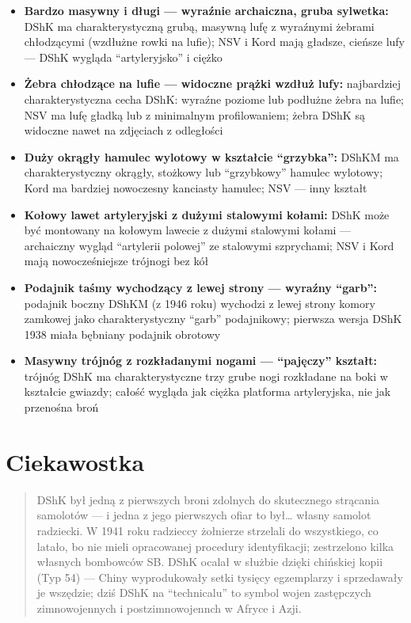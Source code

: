 \documentclass[12pt,openany,oneside]{book}
\providecommand{\tightlist}{%
  \setlength{\itemsep}{0pt}\setlength{\parskip}{0pt}}
\begin{document}
\begin{itemize}
\tightlist
\item
  \textbf{Bardzo masywny i długi --- wyraźnie archaiczna, gruba
  sylwetka:} DShK ma charakterystyczną grubą, masywną lufę z wyraźnymi
  żebrami chłodzącymi (wzdłużne rowki na lufie); NSV i Kord mają
  gładsze, cieńsze lufy --- DShK wygląda ``artyleryjsko'' i ciężko
\item
  \textbf{Żebra chłodzące na lufie --- widoczne prążki wzdłuż lufy:}
  najbardziej charakterystyczna cecha DShK: wyraźne poziome lub podłużne
  żebra na lufie; NSV ma lufę gładką lub z minimalnym profilowaniem;
  żebra DShK są widoczne nawet na zdjęciach z odległości
\item
  \textbf{Duży okrągły hamulec wylotowy w kształcie ``grzybka'':} DShKM
  ma charakterystyczny okrągły, stożkowy lub ``grzybkowy'' hamulec
  wylotowy; Kord ma bardziej nowoczesny kanciasty hamulec; NSV --- inny
  kształt
\item
  \textbf{Kołowy lawet artyleryjski z dużymi stalowymi kołami:} DShK
  może być montowany na kołowym lawecie z dużymi stalowymi kołami ---
  archaiczny wygląd ``artylerii polowej'' ze stalowymi szprychami; NSV i
  Kord mają nowocześ­niejsze trójnogi bez kół
\item
  \textbf{Podajnik taśmy wychodzący z lewej strony --- wyraźny
  ``garb'':} podajnik boczny DShKM (z 1946 roku) wychodzi z lewej strony
  komory zamkowej jako charakterystyczny ``garb'' podajnikowy; pierwsza
  wersja DShK 1938 miała bębniany podajnik obrotowy
\item
  \textbf{Masywny trójnóg z rozkładanymi nogami --- ``pajęczy''
  kształt:} trójnóg DShK ma charakterystyczne trzy grube nogi rozkładane
  na boki w kształcie gwiazdy; całość wygląda jak ciężka platforma
  artyleryjska, nie jak przenośna broń
\end{itemize}

\section{Ciekawostka}\label{ciekawostka-58}

\begin{quote}
DShK był jedną z pierwszych broni zdolnych do skutecznego strącania
samolotów --- i jedna z jego pierwszych ofiar to był\ldots{} własny
samolot radziecki. W 1941 roku radzieccy żołnierze strzelali do
wszystkiego, co latało, bo nie mieli opracowanej procedury
identyfikacji; zestrzelono kilka własnych bombowców SB. DShK ocalał w
służbie dzięki chińskiej kopii (Typ 54) --- Chiny wyprodukowały setki
tysięcy egzemplarzy i sprzedawały je wszędzie; dziś DShK na
``technicalu'' to symbol wojen zastępczych zimnowojennych i
postzimnowojennch w Afryce i Azji.
\end{quote}
\end{document}
